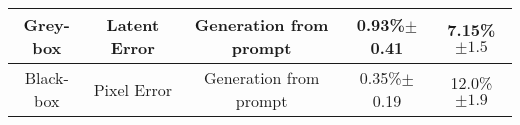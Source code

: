 \begin{tabular}{c c c c c}
    Grey-box                    & Latent Error                  & Generation from prompt & 0.93\%$\pm$0.41                                      & 7.15\%$\pm1.5$     \\
    \midrule
    Black-box                   & Pixel Error                   & Generation from prompt & 0.35\%$\pm$0.19                                      & 12.0\%$\pm1.9$     \\
    \bottomrule
\end{tabular}